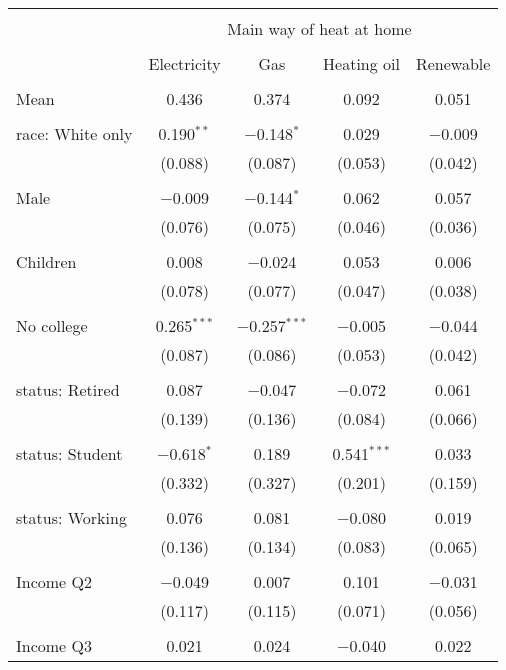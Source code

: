 
\begin{tabular}{@{\extracolsep{5pt}}lcccc} 
\\[-1.8ex]\hline 
\hline \\[-1.8ex] 
 & \multicolumn{4}{c}{Main way of heat at home} \\ 
\cline{2-5} 
\\[-1.8ex] & Electricity & Gas & Heating oil & Renewable \\ 
\hline \\[-1.8ex] 
 Mean & 0.436 & 0.374 & 0.092 & 0.051  \\ \hline \\[-1.8ex] race: White only & 0.190$^{**}$ & $-$0.148$^{*}$ & 0.029 & $-$0.009 \\ 
  & (0.088) & (0.087) & (0.053) & (0.042) \\ 
  & & & & \\ 
 Male & $-$0.009 & $-$0.144$^{*}$ & 0.062 & 0.057 \\ 
  & (0.076) & (0.075) & (0.046) & (0.036) \\ 
  & & & & \\ 
 Children & 0.008 & $-$0.024 & 0.053 & 0.006 \\ 
  & (0.078) & (0.077) & (0.047) & (0.038) \\ 
  & & & & \\ 
 No college & 0.265$^{***}$ & $-$0.257$^{***}$ & $-$0.005 & $-$0.044 \\ 
  & (0.087) & (0.086) & (0.053) & (0.042) \\ 
  & & & & \\ 
 status: Retired & 0.087 & $-$0.047 & $-$0.072 & 0.061 \\ 
  & (0.139) & (0.136) & (0.084) & (0.066) \\ 
  & & & & \\ 
 status: Student & $-$0.618$^{*}$ & 0.189 & 0.541$^{***}$ & 0.033 \\ 
  & (0.332) & (0.327) & (0.201) & (0.159) \\ 
  & & & & \\ 
 status: Working & 0.076 & 0.081 & $-$0.080 & 0.019 \\ 
  & (0.136) & (0.134) & (0.083) & (0.065) \\ 
  & & & & \\ 
 Income Q2 & $-$0.049 & 0.007 & 0.101 & $-$0.031 \\ 
  & (0.117) & (0.115) & (0.071) & (0.056) \\ 
  & & & & \\ 
 Income Q3 & 0.021 & 0.024 & $-$0.040 & 0.022 \\ 

\end{tabular}
